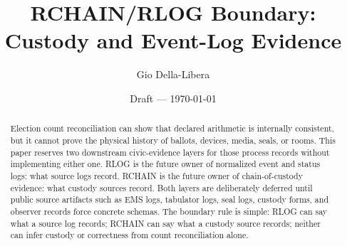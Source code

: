 \documentclass[12pt]{article}
\title{RCHAIN/RLOG Boundary: Custody and Event-Log Evidence}
\author{Gio Della-Libera}
\date{Draft --- \today}
\begin{document}
\maketitle

\begin{abstract}
Election count reconciliation can show that declared arithmetic is internally
consistent, but it cannot prove the physical history of ballots, devices,
media, seals, or rooms. This paper reserves two downstream civic-evidence
layers for those process records without implementing either one. RLOG is the
future owner of normalized event and status logs: what source logs record.
RCHAIN is the future owner of chain-of-custody evidence: what custody sources
record. Both layers are deliberately deferred until public source artifacts
such as EMS logs, tabulator logs, seal logs, custody forms, and observer
records force concrete schemas. The boundary rule is simple: RLOG can say what
a source log records; RCHAIN can say what a custody source records; neither can
infer custody or correctness from count reconciliation alone.
\end{abstract}






\nocite{rcount-overview-2026,civic-evidence-boundaries-2026}


\end{document}
